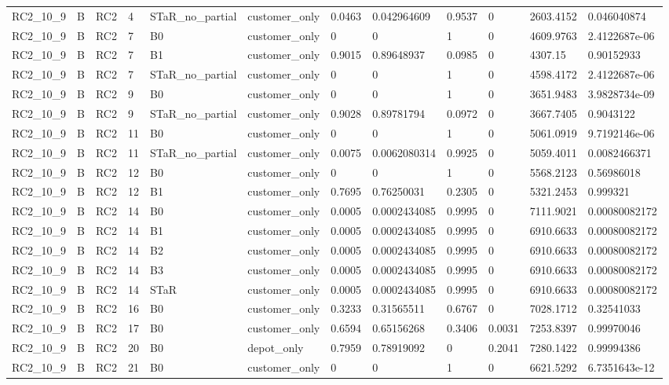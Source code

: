 \begin{longtable}{llllllllllll}
RC2\_10\_9 & B & RC2 & 4 & STaR\_no\_partial & customer\_only & 0.0463 & 0.042964609 & 0.9537 & 0 & 2603.4152 & 0.046040874 \\
RC2\_10\_9 & B & RC2 & 7 & B0 & customer\_only & 0 & 0 & 1 & 0 & 4609.9763 & 2.4122687e-06 \\
RC2\_10\_9 & B & RC2 & 7 & B1 & customer\_only & 0.9015 & 0.89648937 & 0.0985 & 0 & 4307.15 & 0.90152933 \\
RC2\_10\_9 & B & RC2 & 7 & STaR\_no\_partial & customer\_only & 0 & 0 & 1 & 0 & 4598.4172 & 2.4122687e-06 \\
RC2\_10\_9 & B & RC2 & 9 & B0 & customer\_only & 0 & 0 & 1 & 0 & 3651.9483 & 3.9828734e-09 \\
RC2\_10\_9 & B & RC2 & 9 & STaR\_no\_partial & customer\_only & 0.9028 & 0.89781794 & 0.0972 & 0 & 3667.7405 & 0.9043122 \\
RC2\_10\_9 & B & RC2 & 11 & B0 & customer\_only & 0 & 0 & 1 & 0 & 5061.0919 & 9.7192146e-06 \\
RC2\_10\_9 & B & RC2 & 11 & STaR\_no\_partial & customer\_only & 0.0075 & 0.0062080314 & 0.9925 & 0 & 5059.4011 & 0.0082466371 \\
RC2\_10\_9 & B & RC2 & 12 & B0 & customer\_only & 0 & 0 & 1 & 0 & 5568.2123 & 0.56986018 \\
RC2\_10\_9 & B & RC2 & 12 & B1 & customer\_only & 0.7695 & 0.76250031 & 0.2305 & 0 & 5321.2453 & 0.999321 \\
RC2\_10\_9 & B & RC2 & 14 & B0 & customer\_only & 0.0005 & 0.0002434085 & 0.9995 & 0 & 7111.9021 & 0.00080082172 \\
RC2\_10\_9 & B & RC2 & 14 & B1 & customer\_only & 0.0005 & 0.0002434085 & 0.9995 & 0 & 6910.6633 & 0.00080082172 \\
RC2\_10\_9 & B & RC2 & 14 & B2 & customer\_only & 0.0005 & 0.0002434085 & 0.9995 & 0 & 6910.6633 & 0.00080082172 \\
RC2\_10\_9 & B & RC2 & 14 & B3 & customer\_only & 0.0005 & 0.0002434085 & 0.9995 & 0 & 6910.6633 & 0.00080082172 \\
RC2\_10\_9 & B & RC2 & 14 & STaR & customer\_only & 0.0005 & 0.0002434085 & 0.9995 & 0 & 6910.6633 & 0.00080082172 \\
RC2\_10\_9 & B & RC2 & 16 & B0 & customer\_only & 0.3233 & 0.31565511 & 0.6767 & 0 & 7028.1712 & 0.32541033 \\
RC2\_10\_9 & B & RC2 & 17 & B0 & customer\_only & 0.6594 & 0.65156268 & 0.3406 & 0.0031 & 7253.8397 & 0.99970046 \\
RC2\_10\_9 & B & RC2 & 20 & B0 & depot\_only & 0.7959 & 0.78919092 & 0 & 0.2041 & 7280.1422 & 0.99994386 \\
RC2\_10\_9 & B & RC2 & 21 & B0 & customer\_only & 0 & 0 & 1 & 0 & 6621.5292 & 6.7351643e-12 \\
\hline
\end{longtable}

